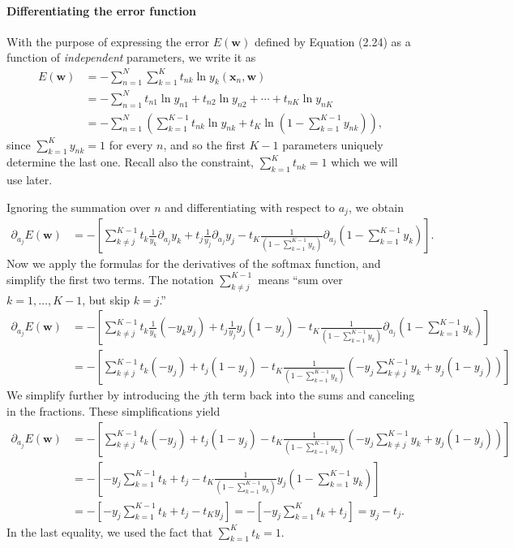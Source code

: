 \documentclass[12pt, a4paper]{article}
\newcommand{\vect}[1]{\bm{#1}}
\begin{document}
\paragraph{Differentiating the error function}
With the purpose of expressing the error $E(\vect{w})$ defined by Equation (2.24) as a function of \emph{independent} parameters, we write it as
\begin{align*}
	E(\vect{w})
	&=
	- \sum_{n=1}^{N}  \sum_{k=1}^{K} t_{nk} \ln y_k (\vect{x}_n, \vect{w}) \\
	&= 
	- \sum_{n=1}^{N}  t_{n1} \ln y_{n1} + t_{n2} \ln y_{n2} + \cdots + t_{nK} \ln y_{nK}\\
	&= 
	- \sum_{n=1}^{N}  \left( \sum_{k=1}^{K-1} t_{nk} \ln y_{nk} 
	+ t_{K}
	\ln \left( 1 - \sum_{k=1}^{K-1} y_{nk} \right)
	\right),
\end{align*}
since $\sum_{k=1}^{K} y_{nk} = 1$ for every $n$, and so the first $K-1$ parameters uniquely determine the last one.
Recall also the constraint, $\sum_{k=1}^{K} t_{nk} = 1$ which we will use later.

Ignoring the summation over $n$ and differentiating with respect to $a_j$, we obtain
\begin{align*}
\partial_{a_j} E(\vect{w})
&=
- \left[ 
\sum_{k \neq j}^{K-1} t_k \frac{1}{y_k} \partial_{a_j} y_k
+
t_j \frac{1}{y_j} \partial_{a_j} y_j
-
t_{K}
\frac{1}{\left( 1 - \sum_{k=1}^{K-1} y_{k} \right)}
\partial_{a_j} 
\left( 1 - \sum_{k=1}^{K-1} y_{k} \right)
\right].
\end{align*}
Now we apply the formulas for the derivatives of the softmax function, and simplify  the first two terms.
The notation $\sum_{k \neq j}^{K-1}$ means ``sum over $k=1, \ldots, K-1$, but skip $k=j$.''
\begin{align*}
\partial_{a_j} E(\vect{w})
	&=
	- \left[ 
	\sum_{k \neq j}^{K-1} t_k \frac{1}{y_k} (- y_k y_j)
	+
	t_j \frac{1}{y_j} y_j (1 - y_j)
	-
	t_{K}
	\frac{1}{\left( 1 - \sum_{k=1}^{K-1} y_{k} \right)}
	\partial_{a_j} 
	\left( 1 - \sum_{k=1}^{K-1} y_{k} \right)
	\right]
	\\
	&=
	- \left[ 
	\sum_{k \neq j}^{K-1} t_k  (- y_j)
	+
	t_j  (1 - y_j)
	-
	t_{K}
	\frac{1}{\left( 1 - \sum_{k=1}^{K-1} y_{k} \right)}
	\left( - y_j \sum_{k \neq j }^{K-1} y_{k} + y_j (1 - y_j) \right)
	\right]
\end{align*}
We simplify further by introducing the $j$th term back into the sums and canceling in the fractions.
These simplifications yield
\begin{align*}
\partial_{a_j} E(\vect{w})
&=
- \left[ 
\sum_{k \neq j}^{K-1} t_k  (- y_j)
+
t_j  (1 - y_j)
-
t_{K}
\frac{1}{\left( 1 - \sum_{k=1}^{K-1} y_{k} \right)}
\left( - y_j \sum_{k \neq j }^{K-1} y_{k} + y_j (1 - y_j) \right)
\right]
\\
&=
- \left[ 
-y_j \sum_{k = 1}^{K-1} t_k  + t_j
-
t_{K}
\frac{1}{\left( 1 - \sum_{k=1}^{K-1} y_{k} \right)}
y_j \left( 1 - \sum_{k =1 }^{K-1} y_{k} \right)
\right] \\
&=
- \left[ 
-y_j \sum_{k = 1}^{K-1} t_k  + t_j
-
t_{K}
y_j
\right]
= - \left[ 
-y_j \sum_{k = 1}^{K} t_k  + t_j
\right]
= y_j - t_j.
\end{align*}
In the last equality, we used the fact that $\sum_{k=1}^{K} t_{k} = 1$.
\end{document}
